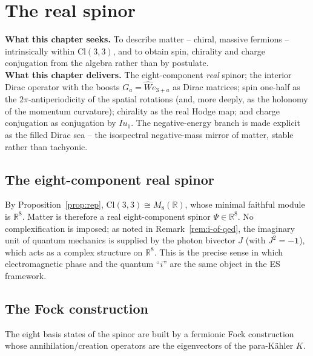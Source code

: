 \documentclass[11pt,oneside]{book}
\newcommand{\Wh}{\hat{W}}                         %
\newcommand{\Cl}{\mathrm{Cl}}                     %
\newcommand{\RR}{\mathbb{R}}
\theoremstyle{plain}
\theoremstyle{definition}
\theoremstyle{remark}
\begin{document}
\chapter{The real spinor}
\label{ch:spinor}

\begin{leavesbox}
\textbf{What this chapter seeks.} To describe matter -- chiral, massive fermions --
intrinsically within $\Cl(3,3)$, and to obtain spin, chirality and charge
conjugation from the algebra rather than by postulate.\\[2pt]
\textbf{What this chapter delivers.} The eight-component \emph{real} spinor; the
interior Dirac operator with the boosts $G_a=\Wh e_{3+a}$ as Dirac matrices;
spin one-half as the $2\pi$-antiperiodicity of the spatial rotations (and, more
deeply, as the holonomy of the momentum curvature); chirality as the real Hodge
map; and charge conjugation as conjugation by $Iu_1$. The negative-energy branch is
made explicit as the filled Dirac sea -- the isospectral negative-mass mirror of
matter, stable rather than tachyonic.
\end{leavesbox}

\section{The eight-component real spinor}
\label{sec:realspinor}

By Proposition~\ref{prop:rep}, $\Cl(3,3)\cong M_8(\RR)$, whose minimal faithful
module is $\RR^8$. Matter is therefore a real eight-component spinor
$\Psi\in\RR^8$. No complexification is imposed; as noted in
Remark~\ref{rem:i-of-qed}, the imaginary unit of quantum mechanics is supplied by
the photon bivector $J$ (with $J^2=-\mathbf 1$), which acts as a complex structure
on $\RR^8$. This is the precise sense in which electromagnetic phase and the
quantum ``$i$'' are the same object in the ES framework.

\section{The Fock construction}
\label{sec:fock}

The eight basis states of the spinor are built by a fermionic Fock construction
whose annihilation/creation operators are the eigenvectors of the para-K\"ahler $K$.
\end{document}
